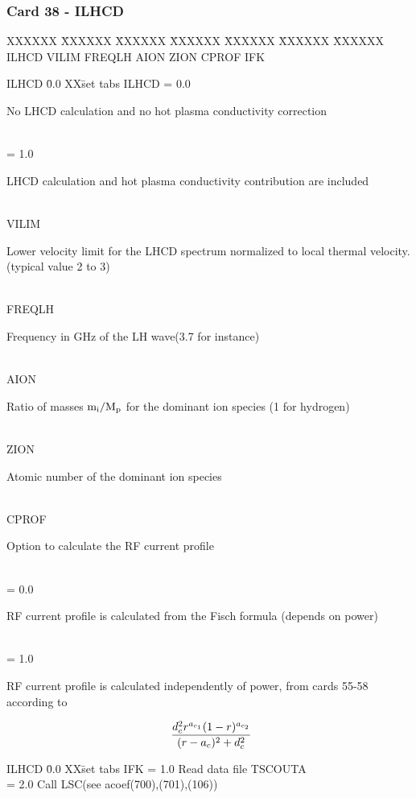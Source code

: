 \newpage \subsubsection{Card 38 - ILHCD}
\begin{tabbing}
XXXXXX \= XXXXXX \= XXXXXX \= XXXXXX \= XXXXXX \= XXXXXX \=
XXXXXX       \\
\footnotesize  ILHCD \>\footnotesize VILIM  \>\footnotesize FREQLH \>\footnotesize AION
\>\footnotesize ZION \>\footnotesize CPROF \>\footnotesize IFK\\
\end{tabbing}
\begin{tabbing}
ILHCD \= 0.0 XX\= set tabs \kill
ILHCD \>= 0.0 \> \parbox[t]{\width}{No LHCD calculation and no hot plasma conductivity correction}\\

      \> = 1.0 \> \parbox[t]{\width}{LHCD calculation and hot plasma conductivity contribution are
included}\\
VILIM \> \>  \parbox[t]{\width}{Lower velocity limit for the LHCD spectrum normalized to
local thermal velocity. (typical value 2 to 3)}\\
FREQLH \> \> \parbox[t]{\width}{Frequency in GHz of the LH wave(3.7 for instance)}\\
AION \> \>\parbox[t]{\width}{Ratio of masses $\rm m_i/M_p$ for the dominant ion species (1
for hydrogen)}\\
ZION \> \>\parbox[t]{\width}{Atomic number of the dominant ion species}\\
CPROF \> \>\parbox[t]{\width}{Option to calculate the RF current profile}\\
      \> = 0.0 \>\parbox[t]{\width}{RF current profile is calculated from the Fisch formula
(depends on power)}\\
      \> = 1.0 \>\parbox[t]{\width}{RF current profile is calculated independently of power, from
cards 55-58 according to}
\end{tabbing}
\begin{displaymath}
\> \> \frac{d_c^2 r^{a_{c_1}}(1-r)^{a_{c_2}}}{(r-a_c)^2+d_c^2}\\
\end{displaymath}
\begin{tabbing}
ILHCD \= 0.0 XX\= set tabs \kill
IFK \>= 1.0 \> Read data file TSCOUTA\\
    \>= 2.0 \> Call LSC(see acoef(700),(701),(106))
\end{tabbing}

